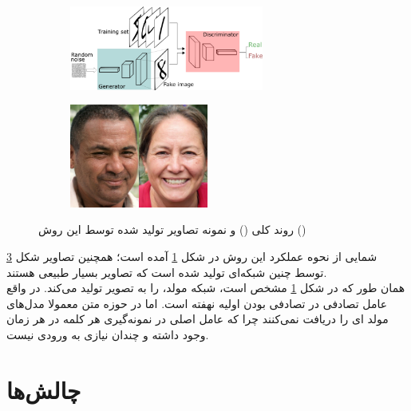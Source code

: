 \begin{figure}[h]
	\centering
	\begin{subfigure}[b]{1.\textwidth}
		\centering
		\includegraphics[width=0.7\textwidth]{images/gan.png}
		\caption{}
		\label{fig:gan_arch}
	\end{subfigure}
	\begin{subfigure}[b]{1.\textwidth}
		\centering
		\includegraphics[width=0.5\textwidth]{images/Nvidia/SelectedGenerated.png}
		\caption{}
		\label{fig:gan_sample}
	\end{subfigure}
	\caption{
		روند کلی \gan{}
		()
		و نمونه تصاویر تولید شده توسط این روش ()
		\cite{gan_nvidia}
	}
\end{figure}
شمایی از نحوه عملکرد این روش در شکل \ref{fig:gan_arch} آمده است؛ همچنین تصاویر شکل \ref{fig:gan_sample} توسط چنین شبکه‌ای تولید شده است که تصاویر بسیار طبیعی هستند.
\\
همان طور که در شکل \ref{fig:gan_arch} مشخص است، شبکه مولد،
را به تصویر تولید می‌کند. در واقع عامل تصادفی در تصادفی بودن \noise{} اولیه نهفته است. اما در حوزه متن معمولا مدل‌های مولد \noise{}‌ای را دریافت نمی‌کنند چرا که عامل اصلی در نمونه‌گیری هر کلمه در هر زمان وجود داشته و چندان نیازی به \noise{} ورودی نیست.
\section{چالش‌ها} \label{chap1:challenge}
